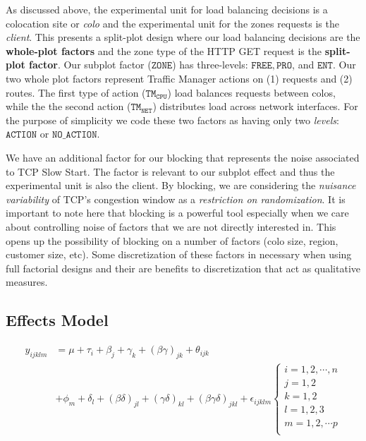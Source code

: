 \documentclass{article}
\begin{document}
As discussed above, the experimental unit for load balancing decisions is a colocation site or \textit{colo} and the experimental unit for the zones requests is the \textit{client}. This presents a split-plot design where our load balancing decisions are the \textbf{whole-plot factors} and the zone type of the HTTP GET request is the \textbf{split-plot factor}. Our subplot factor ($\mathtt{ZONE}$) has three-levels: $\mathtt{FREE}, \mathtt{PRO}$, and $\mathtt{ENT}$. Our two whole plot factors represent Traffic Manager actions on (1) requests and (2) routes. The first type of action ($\mathtt{TM_{CPU}}$) load balances requests between colos, while the the second action ($\mathtt{TM_{NET}}$) distributes load across network interfaces. For the purpose of simplicity we code these two factors as having only two \textit{levels}: $\mathtt{ACTION}$ or $\mathtt{NO\_ACTION}$. 

We have an additional factor for our blocking that represents the noise associated to TCP Slow Start. The factor is relevant to our subplot effect and thus the experimental unit is also the client. By blocking, we are considering the \textit{nuisance variability} of TCP's congestion window as a \textit{restriction on randomization}. %
It is important to note here that blocking is a powerful tool especially when we care about controlling noise of factors that we are not directly interested in. This opens up the possibility of blocking on a number of factors (colo size, region, customer size, etc). Some discretization of these factors in necessary when using full factorial designs and their are benefits to discretization that act as qualitative measures.

\subsection{Effects Model}
\begin{equation} \label{eq1}
\begin{split}
    y_{ijklm} & =  \mu + \tau_{i} + \beta_{j} + \gamma_{k} + (\beta\gamma)_{jk} + \theta_{ijk}  \\
    &  + \phi_m + \delta_{l} + (\beta\delta)_{jl} + (\gamma\delta)_{kl} + (\beta\gamma\delta)_{jkl}
 + \epsilon_{ijklm}
    \begin{cases}
        i = 1,2, \cdots, n \\
        j = 1, 2 \\
        k = 1, 2 \\
        l = 1, 2, 3 \\
        m = 1, 2, \cdots p\\
    \end{cases}
\end{split}
\end{equation}
\end{document}

